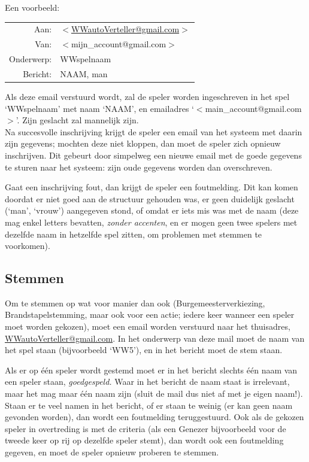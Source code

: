\documentclass[12pt]{article}
\begin{document}
    Een voorbeeld:
    
    \begin{center}
      \begin{tabularx}{0.75\textwidth}[c]{|r X|}
	\hline
	Aan: & \href{mailto:<WWautoVerteller@gmail.com>}{$<$WWautoVerteller@gmail.com$>$} \\
	Van: & $<$mijn\_account@gmail.com$>$ \\
	Onderwerp: & WWspelnaam \\[\baselineskip]	
	Bericht: & NAAM, man \\  
	\hline
      \end{tabularx}
    \end{center}
    
    Als deze email verstuurd wordt, zal de speler worden ingeschreven in het spel `WWspelnaam' met naam `NAAM', en emailadres `$<$main\_account@gmail.com$>$'. Zijn geslacht zal mannelijk zijn.
    \\[\baselineskip]
    Na succesvolle inschrijving krijgt de speler een email van het systeem met daarin zijn gegevens; mochten deze niet kloppen, dan moet de speler zich opnieuw inschrijven. Dit gebeurt door simpelweg een nieuwe email met de goede gegevens te sturen naar het systeem: zijn oude gegevens worden dan overschreven.
    
    Gaat een inschrijving fout, dan krijgt de speler een foutmelding. Dit kan komen doordat er niet goed aan de structuur gehouden was, er geen duidelijk geslacht (`man', `vrouw') aangegeven stond, of omdat er iets mis was met de naam (deze mag enkel letters bevatten, \emph{zonder accenten}, en er mogen geen twee spelers met dezelfde naam in hetzelfde spel zitten, om problemen met stemmen te voorkomen).

  \subsection{Stemmen}
  
    Om te stemmen op wat voor manier dan ook (Burgemeesterverkiezing, Brandstapelstemming, maar ook voor een actie; iedere keer wanneer een speler moet worden gekozen), moet een email worden verstuurd naar het thuisadres, \href{mailto:<WWautoVerteller@gmail.com>}{WWautoVerteller@gmail.com}. In het onderwerp van deze mail moet de naam van het spel staan (bijvoorbeeld `WW5'), en in het bericht moet de stem staan. 
    
    Als er op \'e\'en speler wordt gestemd moet er in het bericht slechts \'e\'en naam van een speler staan, \emph{goedgespeld.} Waar in het bericht de naam staat is irrelevant, maar het mag maar \'e\'en naam zijn (sluit de mail dus niet af met je eigen naam!). Staan er te veel namen in het bericht, of er staan te weinig (er kan geen naam gevonden worden), dan wordt een foutmelding teruggestuurd. Ook als de gekozen speler in overtreding is met de criteria (als een Genezer bijvoorbeeld voor de tweede keer op rij op dezelfde speler stemt), dan wordt ook een foutmelding gegeven, en moet de speler opnieuw proberen te stemmen.
    
\end{document}
